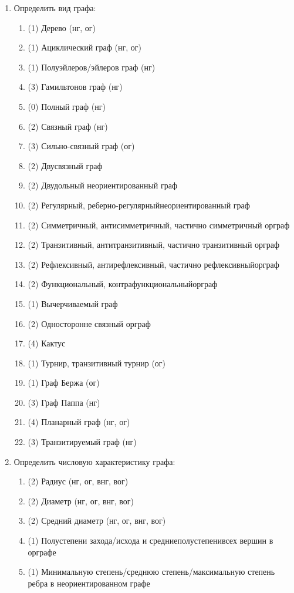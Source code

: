 
\begin{enumerate}
\item Определить вид графа:
  \begin{enumerate}[1.]
  \item (1) Дерево (нг, ог)
  \item (1) Ациклический граф (нг, ог)
  \item (1) Полуэйлеров/эйлеров граф (нг)
  \item (3) Гамильтонов граф (нг)
  \item (0) Полный граф (нг)
  \item (2) Связный граф (нг)
  \item (3) Сильно-связный граф (ог)
  \item (2) Двусвязный граф 
  \item (2) Двудольный неориентированный граф  
  \item (2) Регулярный, реберно-регулярныйнеориентированный граф  
  \item (2) Симметричный, антисимметричный, частично симметричный орграф 
  \item (2) Транзитивный, антитранзитивный, частично транзитивный орграф 
  \item (2) Рефлексивный, антирефлексивный, частично рефлексивныйорграф 
  \item (2) Функциональный, контрафункциональныйорграф 
  \item (1) Вычерчиваемый граф 
  \item (2) Односторонне связный орграф  
  \item (4) Кактус 
  \item (1) Турнир, транзитивный турнир (ог)
  \item (1) Граф Бержа (ог)
  \item (3) Граф Паппа (нг)
  \item (4) Планарный граф (нг, ог)
  \item (3) Транзитируемый граф (нг)
  \end{enumerate}
\item Определить числовую характеристику графа:
  \begin{enumerate}[1.]
  \item (2) Радиус (нг, ог, внг, вог)
  \item (2) Диаметр (нг, ог, внг, вог)
  \item (2) Средний диаметр (нг, ог, внг, вог)
  \item (1) Полустепени захода/исхода и средниеполустепенивсех вершин в орграфе 
  \item (1) Минимальную степень/среднюю степень/максимальную степень ребра в неориентированном графе  

\end{enumerate}
\end{enumerate}

